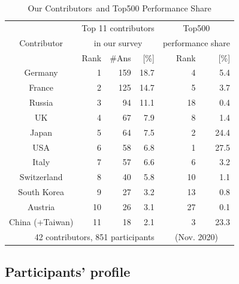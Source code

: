 \documentclass[preprint,5p,times]{elsarticle}
\def\Country{Contributor\xspace{}}%
\def\countries{contributors\xspace{}}%
\def\Countries{Contributors\xspace{}}%
\begin{document}
\begin{table}%
  \small\color{blue}%
\begin{center}%
\caption{Our \Countries\ and Top500 Performance Share}\label{tab:countries}%
\vspace{-1.5mm}
\begin{tabular}{c||r|r|r||r|r}%
  \hline%
  &
  \multicolumn{3}{c||}{Top 11 \countries} &
  \multicolumn{2}{c}{Top500} \\
  \Country &
  \multicolumn{3}{c||}{in our survey} &
  \multicolumn{2}{c}{\footnotesize performance share} \\
  \cline{2-6}%
  & Rank & \#Ans & [\%] & Rank & [\%] \\
  \hline%
  \hline%
  Germany         & 1 & 159 & 18.7 & 4  & 5.4  \\%
  France          & 2 & 125 & 14.7 & 5  & 3.7  \\%
  Russia          & 3 & 94  & 11.1 & 18 & 0.4  \\%
  UK              & 4 & 67  &  7.9 & 8  & 1.4  \\%
  Japan           & 5 & 64  &  7.5 & 2  & 24.4 \\%
  USA             & 6 & 58  &  6.8 & 1  & 27.5 \\%
  Italy           & 7 & 57  &  6.6 & 6  & 3.2  \\%
  \cline{1-4}%
  Switzerland     & 8  & 40 &  5.8 & 10 & 1.1  \\%
  South Korea     & 9  & 27 &  3.2 & 13 & 0.8  \\%
  Austria         & 10 & 26 &  3.1 & 27 & 0.1  \\%
  China (+Taiwan) & 11 & 18 &  2.1 & 3  & 23.3 \\%
  \hline%
  \multicolumn{4}{r}{\footnotesize 42 \countries, 851 participants} &
  \multicolumn{2}{c}{\footnotesize (Nov. 2020)} \\%
\end{tabular}%
\vspace{-3mm}%
\end{center}%
\end{table}%

\subsection*{Participants' profile}
\end{document}
